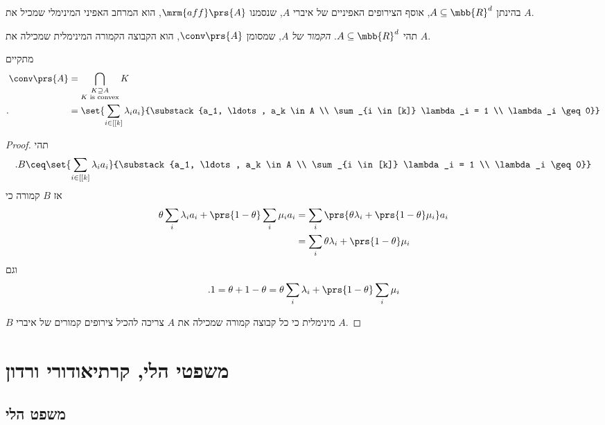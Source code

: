 \documentclass[a4paper,10pt,twoside,openany]{book}
\begin{document}
\begin{exercise}
בהינתן
$A \subseteq \mbb{R}^d$,
אוסף הצירופים האפיניים של איברי
$A$,
שנסמנו
$\mrm{aff}\prs{A}$,
הוא המרחב האפיני המינימלי שמכיל את
$A$.
\end{exercise}

\begin{definition}
תהי
$A \subseteq \mbb{R}^d$.
\emph{הקמור של $A$},
שמסומן
$\conv\prs{A}$,
הוא הקבוצה הקמורה המינימלית שמכילה את
$A$.
\end{definition}

\begin{proposition}
מתקיים
\begin{align*}
\conv\prs{A} &= \bigcap_{\substack{K \supseteq A \\ \text{$K$ is convex}}} K
\\ \text{.} \hphantom{\conv\prs{A}} &= \set{\sum_{i \in [[k]} \lambda_i a_i}{\substack{a_1, \ldots, a_k \in A \\ \sum_{i \in [k]} \lambda_i = 1 \\ \lambda_i \geq 0}}
\end{align*}
\end{proposition}

\begin{proof}
תהי
\[\text{.} B \ceq \set{\sum_{i \in [[k]} \lambda_i a_i}{\substack{a_1, \ldots, a_k \in A \\ \sum_{i \in [k]} \lambda_i = 1 \\ \lambda_i \geq 0}}\]
אז
$B$
קמורה כי
\begin{align*}
\theta \sum_i \lambda_i a_i + \prs{1-\theta} \sum_i \mu_i a_i &= \sum_i \prs{\theta \lambda_i + \prs{1-\theta} \mu_i} a_i \\&=
\sum_i \theta \lambda_i + \prs{1-\theta} \mu_i
\end{align*}
וגם
\[\text{.} 1 = \theta + 1 - \theta = \theta \sum_i \lambda_i + \prs{1-\theta} \sum_i \mu_i\]

$B$
מינימלית כי כל קבוצה קמורה שמכילה את
$A$
צריכה להכיל צירופים קמורים של איברי
$A$.
\end{proof}

\section{משפטי הלי, קרתיאודורי ורדון}

\subsection{משפט הלי}
\end{document}

